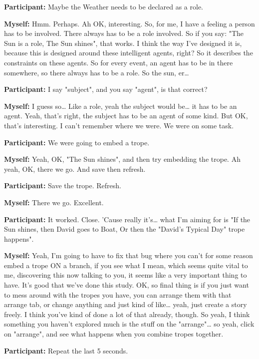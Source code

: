 \documentclass[11pt]{report}
\begin{document}
\begin{linenumbers}
\textbf{Participant:} Maybe the Weather needs to be declared as a role.

\textbf{Myself:} Hmm. Perhaps. Ah OK, interesting. So, for me, I have a feeling
a person has to be involved. There always has to be a role involved. So if you
say: "The Sun is a role, The Sun shines", that works. I think the way I've
designed it is, because this is designed around these intelligent agents, right?
So it describes the constraints on these agents. So for every event, an agent
has to be in there somewhere, so there always has to be a role. So the sun,
er\ldots{}

\textbf{Participant:} I say "subject", and you say "agent", is that correct?

\textbf{Myself:} I guess so\ldots{} Like a role, yeah the subject would be\ldots{} it has to be an agent. Yeah, that's right, the subject has to be an agent of some kind. But OK, that's interesting. I can't remember where we were. We were on some task.

\textbf{Participant:} We were going to embed a trope.

\textbf{Myself:} Yeah, OK, "The Sun shines", and then try embedding the trope. Ah yeah, OK, there we go. And save then refresh.

\textbf{Participant:} Save the trope. Refresh.

\textbf{Myself:} There we go. Excellent.

\textbf{Participant:} It worked. Close. 'Cause really it's\ldots{} what I'm aiming for is "If the Sun shines, then David goes to Boat, Or then the "David's Typical Day" trope happens".

\textbf{Myself:} Yeah, I'm going to have to fix that bug where you can't for
some reason embed a trope ON a branch, if you see what I mean, which seems quite
vital to me, discovering this now talking to you, it seems like a very important
thing to have. It's good that we've done this study. OK, so final thing is if
you just want to mess around with the tropes you have, you can arrange them with
that arrange tab, or change anything and just kind of like\ldots{} yeah, just
create a story freely. I think you've kind of done a lot of that already,
though. So yeah, I think something you haven't explored much is the stuff on the
"arrange"\ldots{} so yeah, click on "arrange", and see what happens when you
combine tropes together.

\textbf{Participant:} Repeat the last 5 seconds.


\end{linenumbers}
\end{document}

